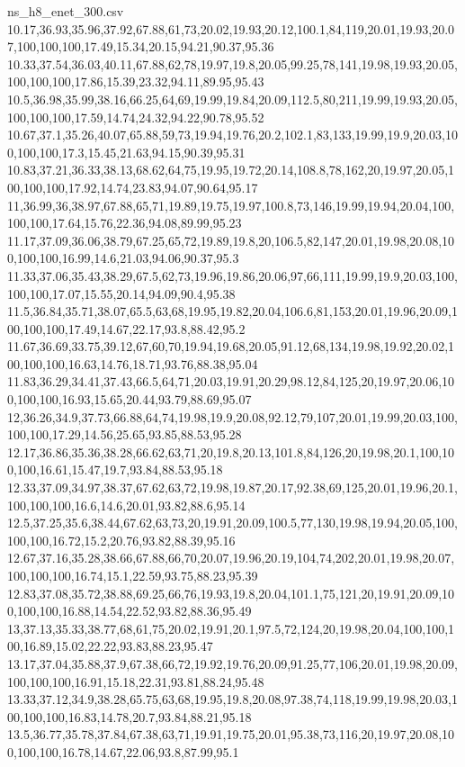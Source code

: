 \begin{filecontents*}[overwrite]{ns_h8_enet_300.csv}
10.17,36.93,35.96,37.92,67.88,61,73,20.02,19.93,20.12,100.1,84,119,20.01,19.93,20.07,100,100,100,17.49,15.34,20.15,94.21,90.37,95.36
10.33,37.54,36.03,40.11,67.88,62,78,19.97,19.8,20.05,99.25,78,141,19.98,19.93,20.05,100,100,100,17.86,15.39,23.32,94.11,89.95,95.43
10.5,36.98,35.99,38.16,66.25,64,69,19.99,19.84,20.09,112.5,80,211,19.99,19.93,20.05,100,100,100,17.59,14.74,24.32,94.22,90.78,95.52
10.67,37.1,35.26,40.07,65.88,59,73,19.94,19.76,20.2,102.1,83,133,19.99,19.9,20.03,100,100,100,17.3,15.45,21.63,94.15,90.39,95.31
10.83,37.21,36.33,38.13,68.62,64,75,19.95,19.72,20.14,108.8,78,162,20,19.97,20.05,100,100,100,17.92,14.74,23.83,94.07,90.64,95.17
11,36.99,36,38.97,67.88,65,71,19.89,19.75,19.97,100.8,73,146,19.99,19.94,20.04,100,100,100,17.64,15.76,22.36,94.08,89.99,95.23
11.17,37.09,36.06,38.79,67.25,65,72,19.89,19.8,20,106.5,82,147,20.01,19.98,20.08,100,100,100,16.99,14.6,21.03,94.06,90.37,95.3
11.33,37.06,35.43,38.29,67.5,62,73,19.96,19.86,20.06,97,66,111,19.99,19.9,20.03,100,100,100,17.07,15.55,20.14,94.09,90.4,95.38
11.5,36.84,35.71,38.07,65.5,63,68,19.95,19.82,20.04,106.6,81,153,20.01,19.96,20.09,100,100,100,17.49,14.67,22.17,93.8,88.42,95.2
11.67,36.69,33.75,39.12,67,60,70,19.94,19.68,20.05,91.12,68,134,19.98,19.92,20.02,100,100,100,16.63,14.76,18.71,93.76,88.38,95.04
11.83,36.29,34.41,37.43,66.5,64,71,20.03,19.91,20.29,98.12,84,125,20,19.97,20.06,100,100,100,16.93,15.65,20.44,93.79,88.69,95.07
12,36.26,34.9,37.73,66.88,64,74,19.98,19.9,20.08,92.12,79,107,20.01,19.99,20.03,100,100,100,17.29,14.56,25.65,93.85,88.53,95.28
12.17,36.86,35.36,38.28,66.62,63,71,20,19.8,20.13,101.8,84,126,20,19.98,20.1,100,100,100,16.61,15.47,19.7,93.84,88.53,95.18
12.33,37.09,34.97,38.37,67.62,63,72,19.98,19.87,20.17,92.38,69,125,20.01,19.96,20.1,100,100,100,16.6,14.6,20.01,93.82,88.6,95.14
12.5,37.25,35.6,38.44,67.62,63,73,20,19.91,20.09,100.5,77,130,19.98,19.94,20.05,100,100,100,16.72,15.2,20.76,93.82,88.39,95.16
12.67,37.16,35.28,38.66,67.88,66,70,20.07,19.96,20.19,104,74,202,20.01,19.98,20.07,100,100,100,16.74,15.1,22.59,93.75,88.23,95.39
12.83,37.08,35.72,38.88,69.25,66,76,19.93,19.8,20.04,101.1,75,121,20,19.91,20.09,100,100,100,16.88,14.54,22.52,93.82,88.36,95.49
13,37.13,35.33,38.77,68,61,75,20.02,19.91,20.1,97.5,72,124,20,19.98,20.04,100,100,100,16.89,15.02,22.22,93.83,88.23,95.47
13.17,37.04,35.88,37.9,67.38,66,72,19.92,19.76,20.09,91.25,77,106,20.01,19.98,20.09,100,100,100,16.91,15.18,22.31,93.81,88.24,95.48
13.33,37.12,34.9,38.28,65.75,63,68,19.95,19.8,20.08,97.38,74,118,19.99,19.98,20.03,100,100,100,16.83,14.78,20.7,93.84,88.21,95.18
13.5,36.77,35.78,37.84,67.38,63,71,19.91,19.75,20.01,95.38,73,116,20,19.97,20.08,100,100,100,16.78,14.67,22.06,93.8,87.99,95.1

\end{filecontents*}
